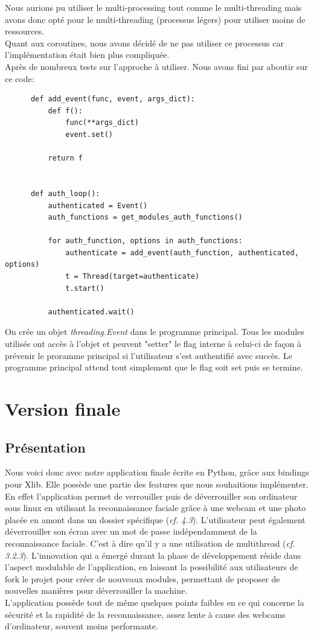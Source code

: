 \documentclass[french]{report}
\begin{document}
Nous aurions pu utiliser le multi-processing tout comme le multi-threading mais avons donc
opté pour le multi-threading (processus légers) pour utiliser moins de ressources.\\
Quant aux coroutines, nous avons décidé de ne pas utiliser ce processus car l'implémentation
était bien plus compliquée.
\\
Après de nombreux tests sur l'approche à utiliser. Nous avons fini par aboutir sur ce code:

  \begin{verbatim}
      def add_event(func, event, args_dict):
          def f():
              func(**args_dict)
              event.set()

          return f


      def auth_loop():
          authenticated = Event()
          auth_functions = get_modules_auth_functions()

          for auth_function, options in auth_functions:
              authenticate = add_event(auth_function, authenticated, options)
              t = Thread(target=authenticate)
              t.start()

          authenticated.wait()
    \end{verbatim}

On crée un objet \emph{threading.Event} dans le programme principal. Tous les modules
utilisés ont accès à l'objet et peuvent "setter" le flag interne à celui-ci de façon
à prévenir le proramme principal si l'utilisateur s'est authentifié avec succès.
Le programme principal attend tout simplement que le flag soit set puis se termine.

\chapter{Version finale}

\newpage

\section{Présentation}
Nous voici donc avec notre application finale écrite en Python, grâce aux bindings
pour Xlib. Elle possède une partie des features que nous souhaitions
implémenter. En effet l'application permet de verrouiller puis de déverrouiller son ordinateur sous linux
en utilisant la reconnaissance faciale grâce à une webcam et une photo placée
en amont dans un dossier spécifique (\emph{cf. 4.3}). L'utilisateur peut également déverrouiller
son écran avec un mot de passe indépendamment de la reconnaissance faciale. C'est
à dire qu'il y a une utilisation de multithread (\emph{cf. 3.2.3}).
L'innovation qui a émergé durant la phase de développement réside dans
l'aspect modulable de l'application, en laissant la possibilité aux utilisateurs
de fork le projet pour créer de nouveaux modules, permettant de proposer de nouvelles manières pour
déverrouiller la machine.\\
L'application possède tout de même quelques points faibles en ce qui concerne la
sécurité et la rapidité de la reconnaissance, assez lente à cause des webcams
d'ordinateur, souvent moins performante.
\end{document}
